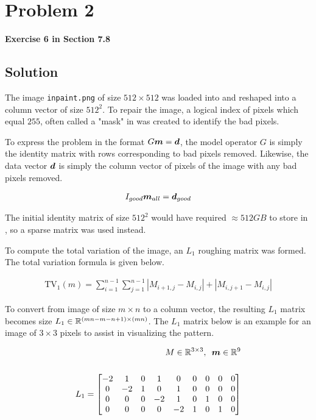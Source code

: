 
\begingroup
\allowdisplaybreaks

\newpage
\section{Problem 2}

\textbf{Exercise 6 in Section 7.8}

\subsection{Solution}

The image \verb|inpaint.png| of size $512 \times 512$ was loaded into \MATLAB and reshaped into a column vector of size $512^2$. To repair the image, a logical index of pixels which equal $255$, often called a "mask" in \MATLAB was created to identify the bad pixels. 

To express the problem in the format $G\boldsymbol{m} = \boldsymbol{d}$, the model operator $G$ is simply the identity matrix with rows corresponding to bad pixels removed. Likewise, the data vector $\boldsymbol{d}$ is simply the column vector of pixels of the image with any bad pixels removed. 

\begin{align*}
	I_{good} \boldsymbol{m}_{all} = \boldsymbol{d}_{good}
\end{align*}

The initial identity matrix of size $512^2$ would have required $\approx512 GB$ to store in \MATLAB, so a sparse matrix was used instead. 

To compute the total variation of the image, an $L_1$ roughing matrix was formed. The total variation formula is given below.

\begin{align*}
	\textrm{TV}_1\left(m\right) = \sum_{i = 1}^{n - 1} \sum_{j = 1}^{n - 1} |M_{i+1,j} - M_{i,j}| + |M_{i,j+1} - M_{i,j}|
\end{align*} 

To convert from image of size $m \times n$ to a column vector, the resulting $L_1$ matrix becomes size $L_1 \in \mathbb{R}^{(mn - m - n + 1) \times (mn)}$. The $L_1$ matrix below is an example for an image of $3 \times 3$ pixels to assist in visualizing the pattern. 

\begin{align*}
	M \in \mathbb{R}^{3 \times 3},\,\,\,\boldsymbol{m} \in \mathbb{R}^{9} \\
	\\
	L_1 = \begin{bmatrix}
		-2 &  1 & 0 &  1 &  0 & 0 & 0 & 0 & 0 \\
		 0 & -2 & 1 &  0 &  1 & 0 & 0 & 0 & 0 \\
		 0 &  0 & 0 & -2 &  1 & 0 & 1 & 0 & 0 \\
		 0 &  0 & 0 &  0 & -2 & 1 & 0 & 1 & 0
	\end{bmatrix}
\end{align*}

